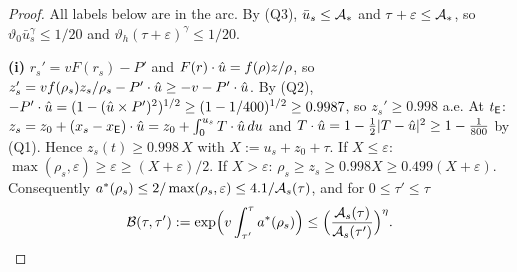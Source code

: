 \begin{proof}
All labels below are in the arc. By (Q3), $\bar u_s\le\mathcal A_*$ and $\tau+\varepsilon\le\mathcal A_*$, so
$\vartheta_0\bar u_s^\gamma\le1/20$ and $\vartheta_h(\tau+\varepsilon)^\gamma\le1/20$.

\smallskip\textbf{(i)} $r_s'=vF(r_s)-P'$ and $F(r)\cdot\hat u=f(\rho)z/\rho$, so
$z_s'=vf(\rho_s)z_s/\rho_s-P'\cdot\hat u\ge-v-P'\cdot\hat u$. By (Q2),
$-P'\cdot\hat u=(1-(\hat u\times P')^2)^{1/2}\ge(1-1/400)^{1/2}\ge0.9987$, so $z_s'\ge0.998$ a.e. At $t_{\mathsf E}$:
$z_s=z_0+(x_s-x_{\mathsf E})\cdot\hat u=z_0+\int_0^{u_s}T\cdot\hat u\,du$ and $T\cdot\hat u=1-\frac12|T-\hat u|^2\ge1-\frac1{800}$ by (Q1). Hence
$z_s(t)\ge0.998\,X$ with $X:=u_s+z_0+\tau$. If $X\le\varepsilon$: $\max(\rho_s,\varepsilon)\ge\varepsilon\ge(X+\varepsilon)/2$. If
$X>\varepsilon$: $\rho_s\ge z_s\ge0.998X\ge0.499(X+\varepsilon)$. Consequently
$a^*(\rho_s)\le2/\max(\rho_s,\varepsilon)\le4.1/\mathcal A_s(\tau)$, and for $0\le\tau'\le\tau$
\begin{equation}\label{eq:T2-31}
\mathcal B(\tau,\tau'):=\exp\Bigl(v\int_{\tau'}^{\tau}a^*(\rho_s)\Bigr)\le\Bigl(\frac{\mathcal A_s(\tau)}{\mathcal A_s(\tau')}\Bigr)^{\eta}.
\end{equation}


\end{proof}
